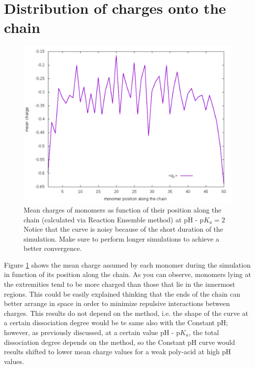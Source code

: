 \documentclass[
a4paper,                        %
11pt,                           %
twoside,                        %
footsepline,                    %
headsepline,                    %
headexclude,                    %
footexclude,                    %
pagesize,                       %
]{scrartcl}
\begin{document}
\section{Distribution of charges onto the chain}

\begin{figure}[h]
	\centering
	\includegraphics[scale=0.6]{figures/qdistrib.pdf}
	\caption{Mean charges of monomers as function of their position along the chain (calculated via Reaction Ensemble method) at $\text{pH - p}K_a = 2$ Notice that the curve is noisy because of the short duration of the simulation. Make sure to perform longer simulations to achieve a better convergence.}
	\label{qdistrib}
\end{figure}
Figure \ref{qdistrib} shows the mean charge assumed by each monomer during the simulation in function of its position along the chain. As you can observe, monomers lying at the extremities tend to be more charged than those that lie in the innermost regions. This could be easily explained thinking that the ends of the chain can better arrange in space in order to minimize repulsive interactions between charges. This results do not depend on the method, i.e. the shape of the curve at a certain dissociation degree would be te same also with the Constant pH; however, as previously discussed, at a certain value $\text{pH - p}K_a$, the total dissociation degree depends on the method, so the Constant pH curve would results shifted to lower mean charge values for a weak poly-acid at high pH values.



\end{document}
